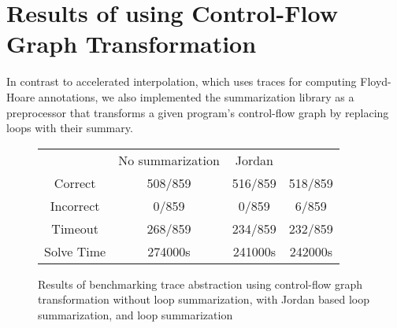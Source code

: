 \section{Results of using Control-Flow Graph Transformation}
In contrast to accelerated interpolation, which uses traces for computing Floyd-Hoare annotations, we also implemented the \qvasr summarization library as a preprocessor that transforms a given program's control-flow graph by replacing loops with their summary.
\begin{figure}[H]
	\centering
	\begin{tabular}{cccc}
		\toprule
		& No summarization & Jordan & \qvasr \\
		\cmidrule{1-4}
		Correct & 508/859 & 516/859 & 518/859 \\
		Incorrect & 0/859 & 0/859 & 6/859 \\
		Timeout & 268/859 & 234/859 & 232/859 \\
		Solve Time &  274000s & 241000s & 242000s
	\end{tabular}
	\label{table_tff}
	\caption{Results of benchmarking trace abstraction using control-flow graph transformation without loop summarization, with Jordan based loop summarization, and \qvasr loop summarization}
\end{figure}